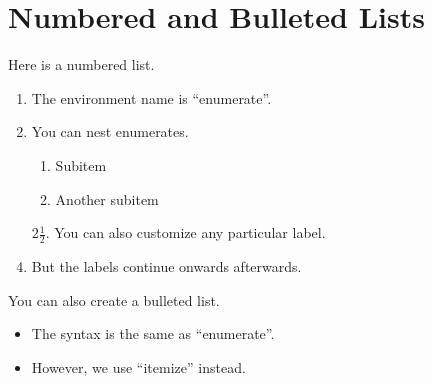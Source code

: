 \documentclass[11pt]{article}
\theoremstyle{plain} %
\theoremstyle{definition}
\theoremstyle{example}
\theoremstyle{remark}
\newcommand{\half}{\frac{1}{2}}
\begin{document}
\section{Numbered and Bulleted Lists}
Here is a numbered list.
\begin{enumerate}
	\item The environment name is ``enumerate''.
	\item You can nest enumerates.
		\begin{enumerate}
			\item Subitem
			\item Another subitem
		\end{enumerate}
	\item[$2 \half$.] You can also customize any particular label.
	\item But the labels continue onwards afterwards.
\end{enumerate}

\bigskip

You can also create a bulleted list.
\begin{itemize}
	\item The syntax is the same as ``enumerate''.
	\item However, we use ``itemize'' instead.
\end{itemize}
\end{document}
